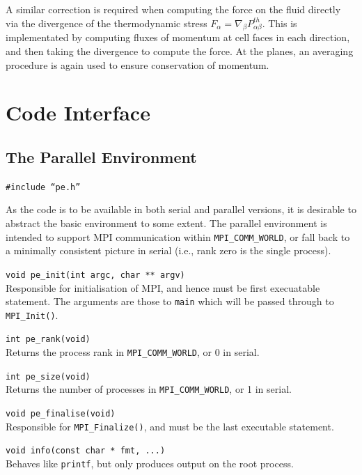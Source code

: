 A similar correction is required when computing the force on the fluid
directly via the divergence of the thermodynamic stress
$F_\alpha = \nabla_\beta P_{\alpha\beta}^{th}$. This is implementated
by computing fluxes of momentum at cell faces in each direction, and
then taking the divergence to compute the force. At the planes, an
averaging procedure is again used to ensure conservation of momentum.



\clearpage
\vfill\pagebreak

\section{Code Interface}

\subsection{The Parallel Environment}

\texttt{\#include ``pe.h''}

As the code is to be available in both serial and parallel versions,
it is desirable to abstract the basic environment to some extent.
The parallel environment is intended to support MPI communication
within \texttt{MPI\_COMM\_WORLD}, or fall back to a minimally
consistent picture in serial (i.e., rank zero is the single process).

\texttt{void pe\_init(int argc, char ** argv)}\\
Responsible for initialisation of MPI, and hence must be first
execuatable statement. The arguments are those to \texttt{main}
which will be passed through to \texttt{MPI\_Init()}.

\texttt{int pe\_rank(void)}\\
Returns the process rank in \texttt{MPI\_COMM\_WORLD}, or 0 in
serial.

\texttt{int pe\_size(void)}\\
Returns the number of processes in \texttt{MPI\_COMM\_WORLD}, or
1 in serial.

\texttt{void pe\_finalise(void)}\\
Responsible for \texttt{MPI\_Finalize()}, and must be the last
executable statement.

\texttt{void info(const char * fmt, ...)}\\
Behaves like \texttt{printf}, but only produces output on the
root process.

